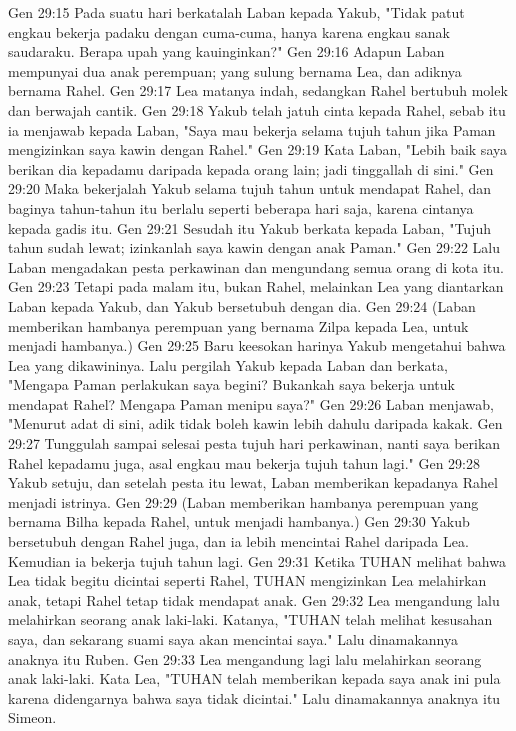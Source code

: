 Gen 29:15  Pada suatu hari berkatalah Laban kepada Yakub, "Tidak patut engkau bekerja padaku dengan cuma-cuma, hanya karena engkau sanak saudaraku. Berapa upah yang kauinginkan?"
Gen 29:16  Adapun Laban mempunyai dua anak perempuan; yang sulung bernama Lea, dan adiknya bernama Rahel.
Gen 29:17  Lea matanya indah, sedangkan Rahel bertubuh molek dan berwajah cantik.
Gen 29:18  Yakub telah jatuh cinta kepada Rahel, sebab itu ia menjawab kepada Laban, "Saya mau bekerja selama tujuh tahun jika Paman mengizinkan saya kawin dengan Rahel."
Gen 29:19  Kata Laban, "Lebih baik saya berikan dia kepadamu daripada kepada orang lain; jadi tinggallah di sini."
Gen 29:20  Maka bekerjalah Yakub selama tujuh tahun untuk mendapat Rahel, dan baginya tahun-tahun itu berlalu seperti beberapa hari saja, karena cintanya kepada gadis itu.
Gen 29:21  Sesudah itu Yakub berkata kepada Laban, "Tujuh tahun sudah lewat; izinkanlah saya kawin dengan anak Paman."
Gen 29:22  Lalu Laban mengadakan pesta perkawinan dan mengundang semua orang di kota itu.
Gen 29:23  Tetapi pada malam itu, bukan Rahel, melainkan Lea yang diantarkan Laban kepada Yakub, dan Yakub bersetubuh dengan dia.
Gen 29:24  (Laban memberikan hambanya perempuan yang bernama Zilpa kepada Lea, untuk menjadi hambanya.)
Gen 29:25  Baru keesokan harinya Yakub mengetahui bahwa Lea yang dikawininya. Lalu pergilah Yakub kepada Laban dan berkata, "Mengapa Paman perlakukan saya begini? Bukankah saya bekerja untuk mendapat Rahel? Mengapa Paman menipu saya?"
Gen 29:26  Laban menjawab, "Menurut adat di sini, adik tidak boleh kawin lebih dahulu daripada kakak.
Gen 29:27  Tunggulah sampai selesai pesta tujuh hari perkawinan, nanti saya berikan Rahel kepadamu juga, asal engkau mau bekerja tujuh tahun lagi."
Gen 29:28  Yakub setuju, dan setelah pesta itu lewat, Laban memberikan kepadanya Rahel menjadi istrinya.
Gen 29:29  (Laban memberikan hambanya perempuan yang bernama Bilha kepada Rahel, untuk menjadi hambanya.)
Gen 29:30  Yakub bersetubuh dengan Rahel juga, dan ia lebih mencintai Rahel daripada Lea. Kemudian ia bekerja tujuh tahun lagi.
Gen 29:31  Ketika TUHAN melihat bahwa Lea tidak begitu dicintai seperti Rahel, TUHAN mengizinkan Lea melahirkan anak, tetapi Rahel tetap tidak mendapat anak.
Gen 29:32  Lea mengandung lalu melahirkan seorang anak laki-laki. Katanya, "TUHAN telah melihat kesusahan saya, dan sekarang suami saya akan mencintai saya." Lalu dinamakannya anaknya itu Ruben.
Gen 29:33  Lea mengandung lagi lalu melahirkan seorang anak laki-laki. Kata Lea, "TUHAN telah memberikan kepada saya anak ini pula karena didengarnya bahwa saya tidak dicintai." Lalu dinamakannya anaknya itu Simeon.
